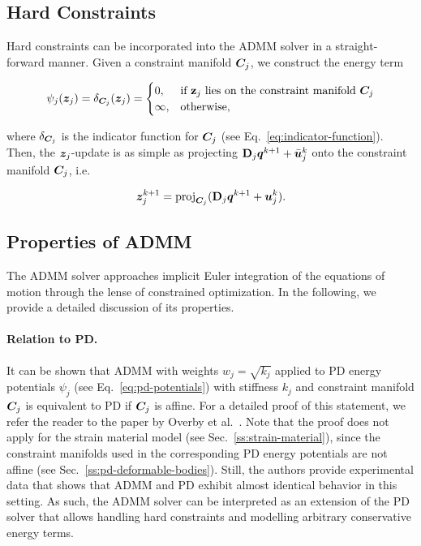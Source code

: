 \subsection{Hard Constraints}\label{ss:admm-hard-constraints}
Hard constraints can be incorporated into the ADMM solver in a straight-forward manner. Given a constraint manifold $\bm{C}_j$, we construct the energy term 

\begin{equation}\label{eq:admm-hard-constraint}
    \psi_j(\bm{z}_j) = \delta_{\bm{C}_j}(\bm{z}_j) = 
\begin{cases}
0,& \text{if } \mathbf{z}_j \text{ lies on the constraint manifold } \bm{C}_j \\
\infty,& \text{otherwise,}
\end{cases}
\end{equation}

\noindent where $\delta_{\bm{C}_j}$ is the indicator function for $\bm{C}_j$ (see Eq.\ \ref{eq:indicator-function}). Then, the $\bm{z}_j$-update is as 
simple as projecting $\mathbf{D}_j\bm{q}^{k+1} + \bar{\bm{u}}^k_j$ onto the constraint manifold $\bm{C}_j$, i.e.\ 

\[
    \bm{z}^{k+1}_j = \text{proj}_{\bm{C}_j}(\mathbf{D}_j \bm{q}^{k+1} + \bm{u}^{k}_j).
\]


\subsection{Properties of ADMM}\label{ss:admm-properties}
The ADMM solver approaches implicit Euler integration of the equations of motion through the lense of constrained optimization. In the following, we provide 
a detailed discussion of its properties.

\paragraph{Relation to PD.}
It can be shown that ADMM with weights $w_j = \sqrt{k_j}$ applied to PD energy potentials $\psi_j$ (see Eq.\ \ref{eq:pd-potentials}) with stiffness $k_j$
and constraint manifold $\bm{C}_j$ is equivalent to PD if $\bm{C}_j$ is affine. For a detailed proof of this statement, we refer the reader to the paper by 
Overby et al.\ \cite{overby2017}. Note that the proof does not apply for the strain material model (see Sec.\ \ref{ss:strain-material}), since the constraint 
manifolds used in the corresponding PD energy potentials are not affine (see Sec.\ \ref{ss:pd-deformable-bodies}). Still, the authors provide experimental data 
that shows that ADMM and PD exhibit almost identical behavior in this setting. As such, the ADMM solver can be interpreted as an 
extension of the PD solver that allows handling hard constraints and modelling arbitrary conservative energy terms.

